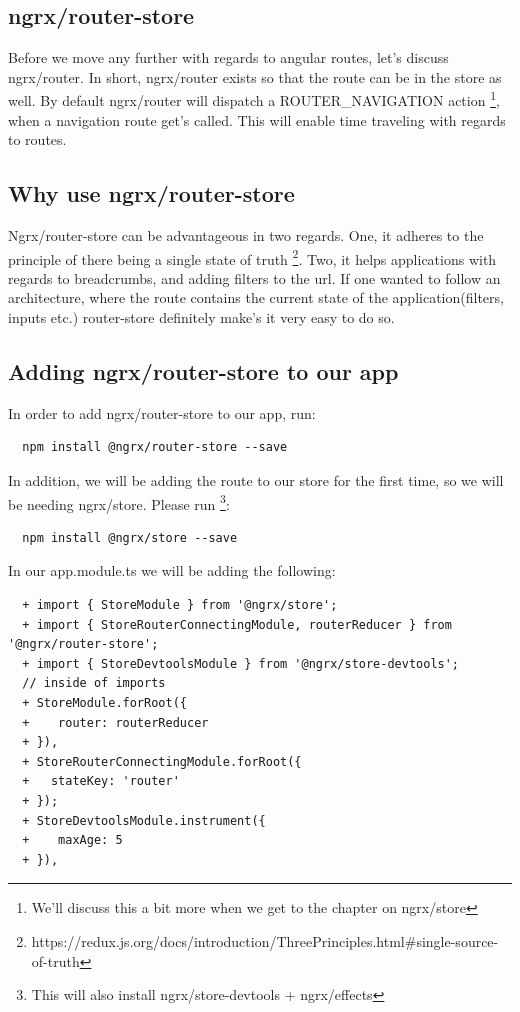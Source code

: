 \subsection{ ngrx/router-store }

Before we move any further with regards to angular routes, let's discuss
ngrx/router. In short, ngrx/router exists so that the route can be in the store
as well. By default ngrx/router will dispatch a ROUTER\_NAVIGATION action
\footnote{We'll discuss this a bit more when we get to the chapter on ngrx/store},
when a navigation route get's called. This will enable time traveling with
regards to routes.

\subsection{ Why use ngrx/router-store }

Ngrx/router-store can be advantageous in two regards. One, it adheres to the
principle of there being a single state of truth \footnote{https://redux.js.org/docs/introduction/ThreePrinciples.html\#single-source-of-truth}.
Two, it helps applications with regards to breadcrumbs, and adding filters to the
url. If one wanted to follow an architecture, where the route contains the current
state of the application(filters, inputs etc.) router-store definitely make's it
very easy to do so.

\subsection{ Adding ngrx/router-store to our app }

In order to add ngrx/router-store to our app, run:
\begin{verbatim}
  npm install @ngrx/router-store --save
\end{verbatim}

In addition, we will be adding the route to our store for the first time, so we
will be needing ngrx/store. Please run \footnote{This will also install ngrx/store-devtools + ngrx/effects}:
\begin{verbatim}
  npm install @ngrx/store --save
\end{verbatim}

In our app.module.ts we will be adding the following:
\begin{verbatim}
  + import { StoreModule } from '@ngrx/store';
  + import { StoreRouterConnectingModule, routerReducer } from '@ngrx/router-store';
  + import { StoreDevtoolsModule } from '@ngrx/store-devtools';
  // inside of imports
  + StoreModule.forRoot({
  +    router: routerReducer
  + }),
  + StoreRouterConnectingModule.forRoot({
  +   stateKey: 'router'
  + });
  + StoreDevtoolsModule.instrument({
  +    maxAge: 5
  + }),
\end{verbatim}
